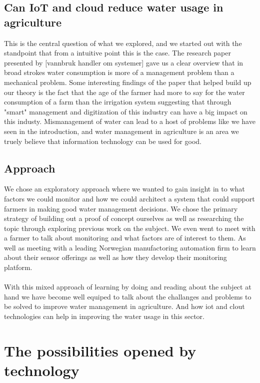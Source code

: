 \documentclass[]{uiophd}
\begin{document}
\subsection{Can IoT and cloud reduce water usage in agriculture}
This is the central question of what we explored, and we started out with the standpoint that from a intuitive point this is the case. The research paper presented by [vannbruk handler om systemer] gave us a clear overview that in broad strokes water consumption is more of a management problem than a mechanical problem. Some interesting findings of the paper that helped build up our theory is the fact that the age of the farmer had more to say for the water consumption of a farm than the irrigation system suggesting that through "smart" management and digitization of this industry can have a big impact on this industy. Mismanagement of water can lead to a host of problems like we have seen in the introduction, and water management in agriculture is an area we truely believe that information technology can be used for good.

\subsection{Approach}
We chose an exploratory approach where we wanted to gain insight in to what factors we could monitor and how we could architect a system that could support farmers in making good water management decisions. We chose the primary strategy of building out a proof of concept ourselves as well as researching the topic through exploring previous work on the subject. We even went to meet with a farmer to talk about monitoring and what factors are of interest to them. As well as meeting with a leading Norwegian manufactoring automation firm to learn about their sensor offerings as well as how they develop their monitoring platform.
\\\\
With this mixed approach of learning by doing and reading about the subject at hand we have become well equiped to talk about the challanges and problems to be solved to improve water management in agriculture. And how iot and clout technologies can help in improving the water usage in this sector.

\section{The possibilities opened by technology}
\end{document}
